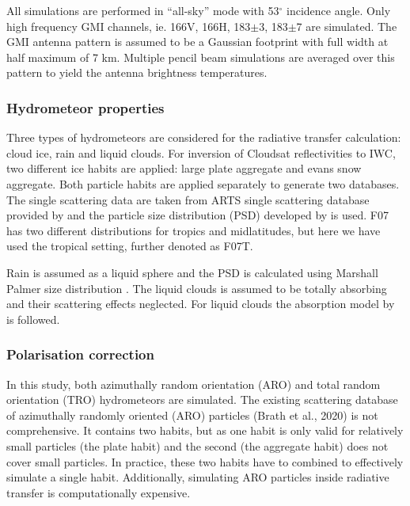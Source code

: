 \documentclass[amt, manuscript]{copernicus}
\begin{document}
All simulations are performed in ``all-sky'' mode with 53$^{\circ}$ incidence angle. Only high frequency GMI channels, ie. 166V, 166H, 183$\pm$3, 183$\pm$7 are simulated. The GMI antenna pattern is assumed to be a Gaussian footprint with full width at half maximum of 7\,\,km. Multiple pencil beam simulations are averaged over this pattern to yield the antenna brightness temperatures.   

\subsubsection{Hydrometeor properties}
\label{sec:hydrometeor_prop}

Three types of hydrometeors are considered for the radiative transfer calculation: cloud ice, rain and liquid clouds. For inversion of Cloudsat reflectivities to IWC, two different ice habits are applied: large plate aggregate and evans snow aggregate. Both particle habits are applied separately to generate two databases.
The single scattering data are taken from ARTS single scattering database provided by \citet{eriksson:agene:18} and the particle size distribution (PSD) developed by \citet{field:snows:07} is used. F07 has two different distributions for tropics and midlatitudes, but here we have used the tropical setting, further denoted as F07T. 


Rain is assumed as a liquid sphere and the PSD is calculated using Marshall Palmer size distribution \citep{marshall:thedi:48}. The liquid clouds is assumed to be totally absorbing and their scattering effects neglected. For liquid clouds the absorption model by \citet{ellison2007permittivity} is followed.  


\subsubsection{Polarisation correction}
\label{sec:scaling_factor}

In this study, both azimuthally random orientation (ARO)  and total random orientation (TRO) hydrometeors are simulated. The existing scattering database of azimuthally randomly oriented (ARO) particles (Brath et al., 2020) is not comprehensive. It contains two habits, but as one habit is only valid for relatively small particles (the plate habit) and the second (the aggregate habit) does not cover small particles. In practice, these two habits have to combined to effectively simulate a single habit. Additionally, simulating ARO particles inside radiative transfer is computationally expensive.
\end{document}
